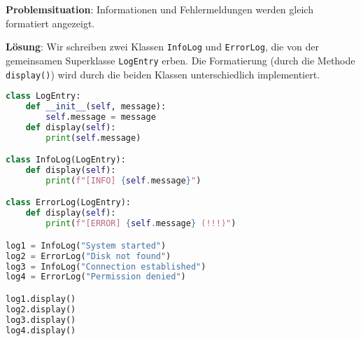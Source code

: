 \documentclass[11pt, a4paper, oneside]{article}
\begin{document}
	
	
	\textbf{Problemsituation}: Informationen und Fehlermeldungen werden gleich formatiert angezeigt.
	
	
	
	\textbf{Lösung}: Wir schreiben zwei Klassen \texttt{InfoLog} und \texttt{ErrorLog}, die von der gemeinsamen Superklasse \texttt{LogEntry} erben.
	Die Formatierung (durch die Methode \texttt{display()}) wird durch die beiden Klassen unterschiedlich implementiert.
	
	
	\begin{lstlisting}[language=python]
class LogEntry:
	def __init__(self, message):
		self.message = message
	def display(self):
		print(self.message)

class InfoLog(LogEntry):
	def display(self):
		print(f"[INFO] {self.message}")

class ErrorLog(LogEntry):
	def display(self):
		print(f"[ERROR] {self.message} (!!!)")

log1 = InfoLog("System started")
log2 = ErrorLog("Disk not found")
log3 = InfoLog("Connection established")
log4 = ErrorLog("Permission denied")

log1.display()
log2.display()
log3.display()
log4.display()
	\end{lstlisting}
	
\end{document}
